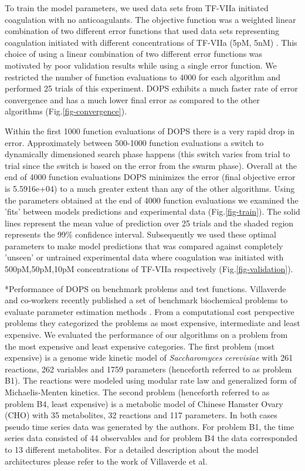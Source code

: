 \documentclass[12pt]{article}
\makeatletter
\renewcommand\subsection{\@startsection
	{subsection}{2}{0mm}
	{-0.05in}
	{-0.5\baselineskip}
	{\normalfont\normalsize\bfseries}}
\makeatother
\begin{document}
To train the model parameters, we used data sets from TF-VIIa initiated coagulation with no anticoagulants. The objective function was a weighted linear combination of two different error functions that used data sets representing coagulation initiated with different concentrations of TF-VIIa (5pM, 5nM) \cite{hockin2002model}. This choice of using a linear combination of two different error functions was motivated by poor validation results while using a single error function.  We restricted the number of function evaluations to 4000 for each algorithm and performed 25 trials of this experiment. DOPS exhibits a much faster rate of error convergence and has a much lower final error as compared to the other algorithms (Fig.\ref{fig-convergence}).

 Within the first 1000 function evaluations  of DOPS there is a very rapid drop in error. Approximately between 500-1000 function evaluations a switch to dynamically dimensioned search phase happens (this switch varies from trial to trial since the switch is based on the error from the swarm phase). Overall at the end of 4000 function evaluations DOPS minimizes the error (final objective error is 5.5916e+04) to a much greater extent than any of the other algorithms. Using the parameters obtained at the end of 4000 function evaluations we examined the 'fits' between models predictions and experimental data (Fig.\ref{fig-train}). The solid lines represent the mean value of prediction over 25 trials and the shaded region represents the 99\% confidence interval. Subsequently we used these optimal parameters to make model predictions that was compared against completely 'unseen' or untrained experimental data where coagulation was initiated with 500pM,50pM,10pM concentrations of TF-VIIa respectively (Fig.\ref{fig-validation}).

\subsection*{Performance of DOPS on benchmark problems and test functions.}
Villaverde and co-workers recently published a set of benchmark biochemical problems to evaluate parameter estimation methods \cite{villaverde2015biopredyn}. From a computational cost perspective problems they categorized the problems as most expensive, intermediate and least expensive. We evaluated the performance of our algorithms on a problem from the most expensive and least expensive categories. The first problem (most expensive) is a genome wide kinetic model of \textit{Saccharomyces cerevisiae} with 261 reactions, 262 variables and 1759 parameters (henceforth referred to as problem B1). The reactions were modeled using modular rate law and generalized form of Michaelis-Menten kinetics.   The second problem (henceforth referred to as problem B4, least expensive) is a metabolic model of Chinese Hamster Ovary (CHO) with 35 metabolites, 32 reactions and 117 parameters. In both cases pseudo time series data was generated by the authors.  For problem B1, the time series data consisted of 44 observables and for problem B4 the data corresponded to 13 different metabolites. For a detailed description about the model architectures please refer to the work of Villaverde et al. \cite{villaverde2015biopredyn}
\end{document}
